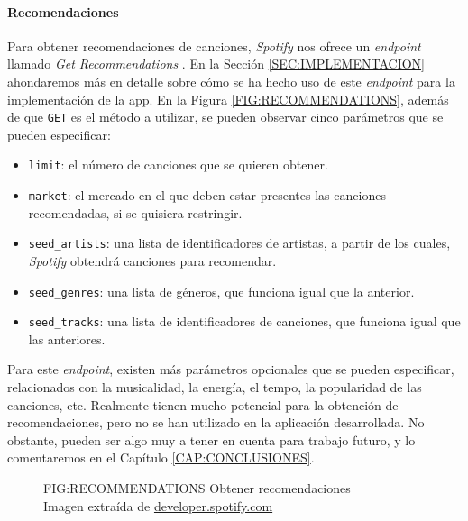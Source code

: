 \paragraph{Recomendaciones\label{subsec:recomendaciones}}

Para obtener recomendaciones de canciones, \textit{Spotify} nos ofrece un \textit{endpoint} llamado \textit{Get Recommendations} \cite{recommendations}.
En la Sección \ref{SEC:IMPLEMENTACION} ahondaremos más en detalle sobre cómo se ha hecho uso de este 
\textit{endpoint} para la implementación de la app. En la Figura \ref{FIG:RECOMMENDATIONS}, además de que
\texttt{GET} es el método a utilizar, se pueden observar cinco parámetros que se pueden especificar:

\begin{itemize}
  \item \texttt{limit}: el número de canciones que se quieren obtener.
  \item \texttt{market}: el mercado en el que deben estar presentes las canciones recomendadas,
  si se quisiera restringir.
  \item \texttt{seed\_artists}: una lista de identificadores de artistas, a partir de los cuales, 
  \textit{Spotify} obtendrá canciones para recomendar.
  \item \texttt{seed\_genres}: una lista de géneros, que funciona igual que la anterior.
  \item \texttt{seed\_tracks}: una lista de identificadores de canciones, que funciona igual que las anteriores.
\end{itemize}

Para este \textit{endpoint}, existen más parámetros opcionales que se pueden especificar, relacionados con 
la musicalidad, la energía, el tempo, la popularidad de las canciones, etc. Realmente tienen mucho potencial para 
la obtención de recomendaciones, pero no se han utilizado en la aplicación desarrollada. No obstante, pueden ser algo 
muy a tener en cuenta para trabajo futuro, y lo comentaremos en el Capítulo \ref{CAP:CONCLUSIONES}.

\begin{figure}[Obtener recomendaciones]{FIG:RECOMMENDATIONS}
    {Obtener recomendaciones \\
    {\scriptsize Imagen extraída de \href{https://developer.spotify.com/documentation/web-api/reference/get-recommendations}{developer.spotify.com}}}
\end{figure}

